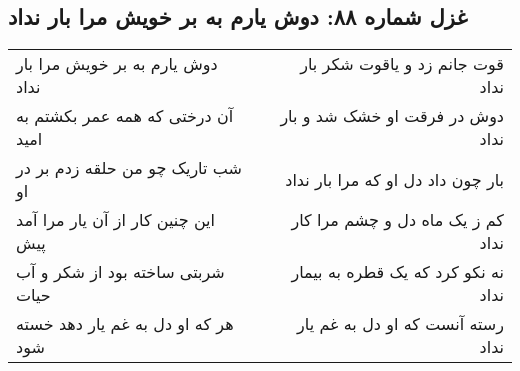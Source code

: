 \begin{center}
\section*{غزل شماره ۸۸: دوش یارم به بر خویش مرا بار نداد}
\label{sec:088}
\begin{longtable}{l p{0.5cm} r}
دوش یارم به بر خویش مرا بار نداد
&&
قوت جانم زد و یاقوت شکر بار نداد
\\
آن درختی که همه عمر بکشتم به امید
&&
دوش در فرقت او خشک شد و بار نداد
\\
شب تاریک چو من حلقه زدم بر در او
&&
بار چون داد دل او که مرا بار نداد
\\
این چنین کار از آن یار مرا آمد پیش
&&
کم ز یک ماه دل و چشم مرا کار نداد
\\
شربتی ساخته بود از شکر و آب حیات
&&
نه نکو کرد که یک قطره به بیمار نداد
\\
هر که او دل به غم یار دهد خسته شود
&&
رسته آنست که او دل به غم یار نداد
\\
\end{longtable}
\end{center}
